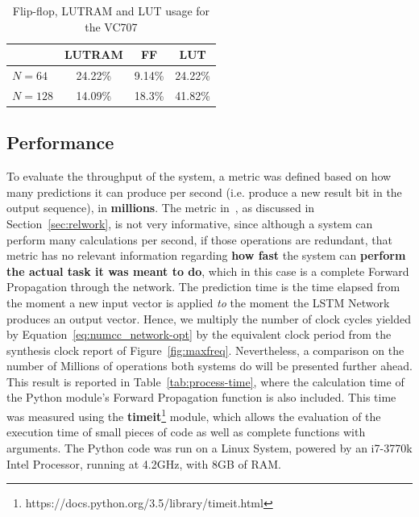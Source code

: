 \documentclass[conference]{IEEEtran}
\begin{document}
\begin{table}
	\caption{Flip-flop, LUTRAM and LUT usage for the VC707}
	\label{tab:ff-virtx7}
    \centering
  \begin{tabular}{ | l | c | c | c |}
    \hline
         & LUTRAM  & FF & LUT \\
    \hline
    $N=64$ & 24.22\%  & 9.14\% & 24.22\% \\
    \hline
    $N=128$ & 14.09\%  & 18.3\% & 41.82\%\\
\hline
  \end{tabular}
\end{table}

\subsection{Performance}
To evaluate the throughput of the system, a metric was defined based on how many predictions it can produce per second (i.e. produce a new result bit in the output sequence),
in \textbf{millions}. The metric in~\cite{Chang15}, as discussed in Section~\ref{sec:relwork}, is not very informative, since
although a system can perform many calculations per second, if those operations are redundant, that metric has no relevant information
regarding \textbf{how fast} the system can \textbf{perform the actual task it was meant to do}, which in this case is a complete Forward
Propagation through the network. The prediction time is the time elapsed from the moment a new input vector is applied \emph{to} the moment the LSTM
Network produces an output vector. Hence, we multiply the number of clock cycles yielded by Equation~\ref{eq:numcc_network-opt} by the equivalent clock period
from the synthesis clock report of Figure~\ref{fig:maxfreq}. Nevertheless, a comparison on the number of Millions of operations both systems do will be presented further ahead.
This result is reported in Table~\ref{tab:process-time}, where the calculation time of the Python module's Forward Propagation function is
also included. This time was measured using the \textbf{timeit}\footnote{https://docs.python.org/3.5/library/timeit.html}  module, which allows
the evaluation of the execution time of small pieces of code as well as complete functions with arguments. The Python code was run on a Linux System,
powered by an i7-3770k Intel Processor, running at 4.2GHz, with 8GB of RAM.
\end{document}
